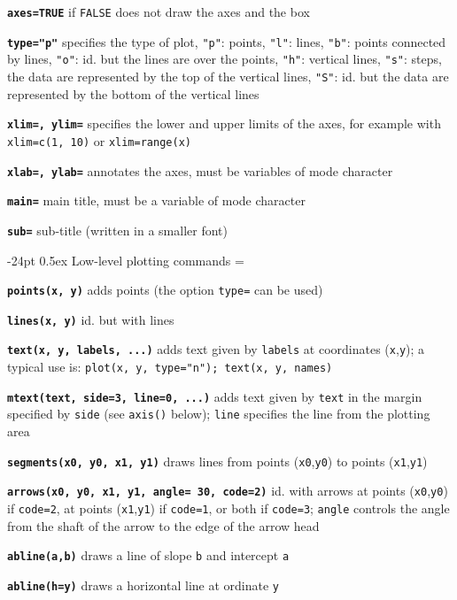 \documentclass[8pt,landscape]{article}
\makeatletter
\renewcommand\section{\@startsection{section}{1}{0mm}%
                                     {-24pt}%
                                     {0.5ex}%
                                {\color{blue}\normalfont\large\bfseries}}
\newcommand{\code}{\texttt}
\newcommand{\bcode}[1]{\texttt{\textbf{#1}}}
\newcommand\F{\code{FALSE}}
\makeatother
\begin{document}
\begin{multicols*}{3}
\bcode{axes=TRUE}  if \F{} does not draw the axes and the box

\bcode{type="p"}  specifies the type of plot, \code{"p"}: points, \code{"l"}: lines, \code{"b"}: points connected by lines, \code{"o"}: id. but the lines are over the points, \code{"h"}: vertical lines, \code{"s"}: steps, the data are represented by the top of the vertical lines, \code{"S"}: id. but the data are represented by the bottom of the vertical lines

\bcode{xlim=, ylim=}  specifies the lower and upper limits of the axes, for example with \code{xlim=c(1, 10)} or \code{xlim=range(x)}

\bcode{xlab=, ylab=}  annotates the axes, must be variables of mode character

\bcode{main=}  main title, must be a variable of mode character

\bcode{sub=}  sub-title (written in a smaller font)




\section{Low-level plotting commands}
\everypar={\hangindent=9mm}

\bcode{points(x, y)}  adds points (the option \code{type=} can be used)

\bcode{lines(x, y)}  id. but with lines

\bcode{text(x, y, \mbox{labels}, ...)}  adds text given by \code{labels} at coordinates (\code{x},\code{y}); a typical use is: \code{plot(x, y, type="n"); text(x, y, names)}

\bcode{mtext(text, side=3, line=0, ...)}  adds text given by \code{text} in the margin specified by \code{side} (see \code{axis()} below); \code{line} specifies the line from the plotting area

\bcode{segments(x0, y0, x1, y1)}  draws lines from points (\code{x0},\code{y0}) to points (\code{x1},\code{y1})

\bcode{arrows(x0, y0, x1, y1, angle= 30, code=2)}  id. with arrows at points (\code{x0},\code{y0}) if \code{code=2}, at points (\code{x1},\code{y1}) if \code{code=1}, or both if \code{code=3}; \code{angle} controls the angle from the shaft of the arrow to the edge of the arrow head

\bcode{abline(a,b)}  draws a line of slope \code{b} and intercept \code{a}

\bcode{abline(h=y)}  draws a horizontal line at ordinate \code{y}


\end{multicols*}
\end{document}
